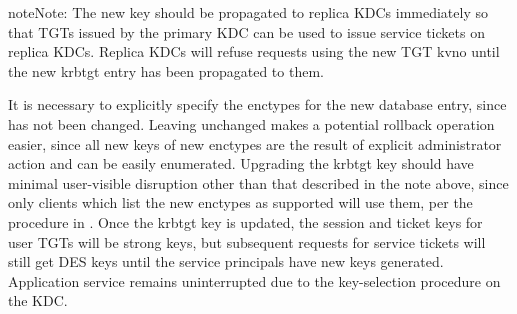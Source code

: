 \documentclass[letterpaper,10pt,english]{sphinxmanual}
\begin{document}
%
\begin{sphinxVerbatim}[commandchars=\\\{\}]
\PYG{p}{[} \PYG{p}{]}
 
\PYG{p}{[} \PYG{p}{]}
  
     
   
\end{sphinxVerbatim}

\begin{sphinxadmonition}{note}{Note:}
The new  key should be propagated to replica KDCs
immediately so that TGTs issued by the primary KDC can be used to
issue service tickets on replica KDCs.  Replica KDCs will refuse
requests using the new TGT kvno until the new krbtgt entry has
been propagated to them.
\end{sphinxadmonition}

It is necessary to explicitly specify the enctypes for the new database
entry, since  has not been changed.  Leaving
 unchanged makes a potential rollback operation
easier, since all new keys of new enctypes are the result of explicit
administrator action and can be easily enumerated.
Upgrading the krbtgt key should have minimal user-visible disruption other
than that described in the note above, since only clients which list the
new enctypes as supported will use them, per the procedure
in {\hyperref[\detokenize{admin/enctypes:session-key-selection}]{}}.
Once the krbtgt key is updated, the session and ticket keys for user
TGTs will be strong keys, but subsequent requests
for service tickets will still get DES keys until the service principals
have new keys generated.  Application service
remains uninterrupted due to the key-selection procedure on the KDC.
\end{document}
